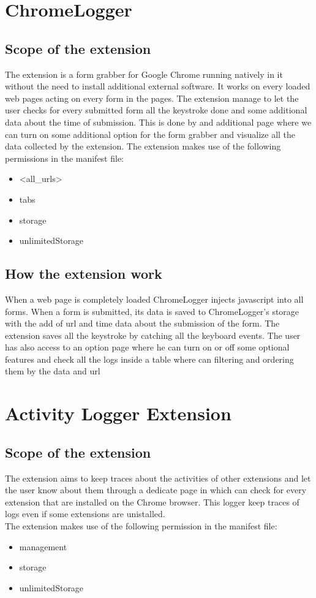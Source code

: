 \documentclass[12pt]{article}
\begin{document}
\begin{multicols}{2}
\section*{ChromeLogger}
\subsection*{Scope of the extension}
The extension is a form grabber for Google Chrome running natively in it without the need to install additional external software. It works on every loaded web pages acting on every form in the pages.
The extension manage to let the user checks for every submitted form all the keystroke done and some additional data about the time of submission. This is done by and additional page where we can turn on some additional option for the form grabber and visualize all the data collected by the extension.
The extension makes use of the following permissions in the manifest file:
{\fontsize{10}{10}\selectfont
	\begin{itemize}
		\item  <all\_urls>
		\item  tabs
		\item  storage
		\item  unlimitedStorage
	\end{itemize}
}
\subsection*{How the extension work}
When a web page is completely loaded ChromeLogger injects javascript into all forms. When a form is submitted, its data is saved to ChromeLogger's storage with the add of url and time data about the submission of the form.
The extension saves all the keystroke by catching all the keyboard events.
The user has also access to an option page where he can turn on or off some optional features and check all the logs inside a table where can filtering and ordering them by the data and url
\section*{Activity Logger Extension}
\subsection*{Scope of the extension}
The extension aims to keep traces about the activities of other extensions and let the user know
about them through a dedicate page in which can check for every extension that are installed on the
Chrome browser. This logger keep traces of logs even if some extensions are unistalled. \\
The extension makes use of the following permission in the manifest file:
{\fontsize{10}{10}\selectfont
	\begin{itemize}
		\item  management
		\item  storage
		\item  unlimitedStorage
	\end{itemize}
}

\end{multicols}
\end{document}
